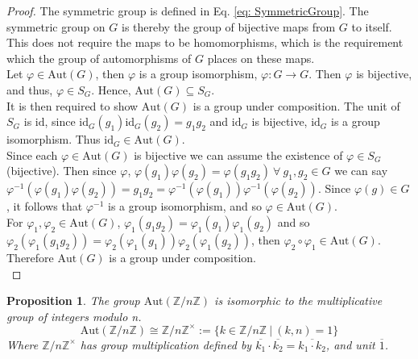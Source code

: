 \documentclass{article}
\newtheorem{theorem}{Proposition}[section]
\theoremstyle{definition}
\theoremstyle{remark}
\begin{document}
\begin{proof}
	The symmetric group is defined in Eq. \ref{eq: SymmetricGroup}. The symmetric group on $G$ is thereby the group of bijective maps from $G$ to itself. This does not require the maps to be homomorphisms, which is the requirement which the group of automorphisms of $G$ places on these maps.\\
	\indent Let $\varphi\in\mathrm{Aut}(G)$, then $\varphi$ is a group isomorphism, $\varphi:G\rightarrow G$. Then $\varphi$ is bijective, and thus, $\varphi\in S_G$. Hence, $\mathrm{Aut}(G)\subseteq S_G$.\\
	\indent It is then required to show $\mathrm{Aut}(G)$ is a group under composition. The unit of $S_G$ is $\mathrm{id}$, since $\mathrm{id}_G(g_1) \mathrm{id}_G(g_2)=g_1g_2$ and $\mathrm{id}_G$ is bijective, $\mathrm{id}_G$ is a group isomorphism. Thus $\mathrm{id}_G\in\mathrm{Aut}(G)$.\\
	\indent Since each $\varphi\in\mathrm{Aut}(G)$ is bijective we can assume the existence of $\varphi\in S_G$ (bijective). Then since $\varphi$, $\varphi(g_1)\varphi(g_2)=\varphi(g_1g_2)~\forall~g_1,g_2\in G$ we can say $\varphi^{-1}(\varphi(g_1)\varphi(g_2))=g_1g_2=\varphi^{-1}(\varphi(g_1))\varphi^{-1}(\varphi(g_2))$. Since $\varphi(g)\in G$, it follows that $\varphi^{-1}$ is a group isomorphism, and so $\varphi\in\mathrm{Aut}(G)$.\\
	\indent For $\varphi_1,\varphi_2\in\mathrm{Aut}(G)$, $\varphi_1(g_1g_2)=\varphi_1(g_1)\varphi_1(g_2)$ and so $\varphi_2(\varphi_1(g_1g_2))=\varphi_2(\varphi_1(g_1))\varphi_2(\varphi_1(g_2))$, then $\varphi_2\circ\varphi_1\in\mathrm{Aut}(G)$.\\
	\indent Therefore $\mathrm{Aut}(G)$ is a group under composition.\\
\end{proof}
\begin{theorem}
	The group $\mathrm{Aut}(\mathbb{Z}/n\mathbb{Z})$ is isomorphic to the multiplicative group of integers modulo n.
	\begin{equation}
		\mathrm{Aut}(\mathbb{Z}/n\mathbb{Z})\cong\mathbb{Z}/n\mathbb{Z}^{\times}:=\lbrace k\in\mathbb{Z}/n\mathbb{Z}~|~(k,n)=1\rbrace
	\end{equation}
	Where $\mathbb{Z}/n\mathbb{Z}^{\times}$ has group multiplication defined by $\overline{k_1}\cdot \overline{k_2}=\overline{k_1\cdot k_2}$, and unit $\overline{1}$.\\
\end{theorem}
\end{document}
